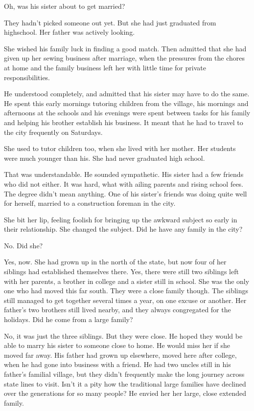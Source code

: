 \documentclass{article}
\begin{document}
Oh, was his sister about to get married?

They hadn't picked someone out yet. But she had just graduated from highschool. Her father was actively looking.

She wished his family luck in finding a good match. Then admitted that she had given up her sewing business after marriage, when the pressures from the chores at home and the family business left her with little time for private responsibilities. 

He understood completely, and admitted that his sister may have to do the same.  He spent this early mornings tutoring children from the village, his mornings and afternoons at the schools and his evenings were spent between tasks for his family and helping his brother establish his business. It meant that he had to travel to the city frequently on Saturdays.

She used to tutor children too, when she lived with her mother. Her students were much younger than his. She had never graduated high school. 

That was understandable. He sounded sympathetic. His sister had a few friends who did not either. It was hard, what with ailing parents and rising school fees. The degree didn't mean anything. One of his sister's friends was doing quite well for herself, married to a construction foreman in the city.

She bit her lip, feeling foolish for bringing up the awkward subject so early in their relationship. She changed the subject. Did he have any family in the city? 

No. Did she? 

Yes, now. She had grown up in the north of the state, but now four of her siblings had established themselves there. Yes, there were still two siblings left with her parents, a brother in college and a sister still in school. She was the only one who had moved this far south. They were a close family though. The siblings still managed to get together several times a year, on one excuse or another. Her father's two brothers still lived nearby, and they always congregated for the holidays. Did he come from a large family?

No, it was just the three siblings. But they were close. He hoped they would be able to marry his sister to someone close to home. He would miss her if she moved far away. His father had grown up elsewhere, moved here after college, when he had gone into business with a friend. He had two uncles still in his father's familial village, but they didn't frequently make the long journey across state lines to visit. Isn't it a pity how the traditional large families have declined over the generations for so many people? He envied her her large, close extended family.
\end{document}
